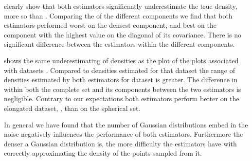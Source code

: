 	 clearly show that both estimators significantly underestimate the true density, \sambe more so than \mbe. 
	Comparing the \mse of the different components we find that both estimators performed worst on the densest component, and best on the component with the highest value on the diagonal of its covariance. There is no significant difference between the estimators within the different components. 

	 shows the same underestimating of densities as the plot of the plots associated with datasets \ferdosiThree. Compared to densities estimated for that dataset the range of densities estimated by both estimators for dataset \baakmanThree is greater. The difference in \mse within both the complete set and 
	its components between the two estimators is negligible. 
	Contrary to our expectations both estimators perform better on the elongated dataset, \ie \ferdosiThree, than on the spherical set. 

	In general we have found that the number of Gaussian distributions embed in the noise negatively influences the performance of both estimators. Furthermore the denser a Gaussian distribution is, the more difficulty the estimators have with correctly approximating the density of the points sampled from it. 